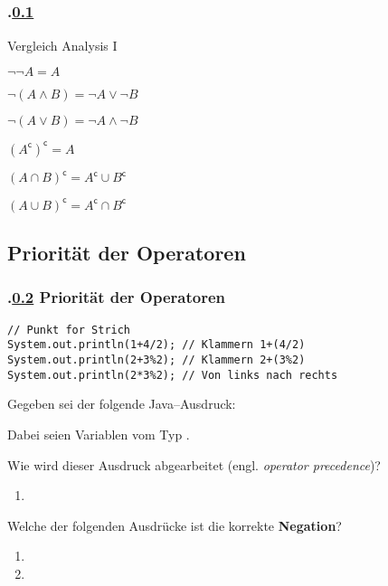 \subsection{\stitle}\label{S:Morgansche}
\begin{frame}[fragile]%
  \frametitle{\kap.\ref{S:Morgansche} \stitle}%
Vergleich Analysis I
\medskip

\begin{description}
  \item[und bzw. oder]
  \item $\neg \neg A = A$
  \item $\neg (A \wedge B) = \neg A \vee \neg B$
  \item $\neg (A \vee B) = \neg A \wedge \neg B$
\end{description}
\medskip

\begin{description}
  \item[Schnittmenge bzw. Vereinigung]
  \item $(A^{\mathsf{c}})^{\mathsf{c}} = A$
  \item $(A \cap B)^{\mathsf{c}} = A^{\mathsf{c}} \cup B^{\mathsf{c}}$
  \item $(A \cup B)^{\mathsf{c}} = A^{\mathsf{c}} \cap B^{\mathsf{c}}$
\end{description}
\end{frame}

\def\sstitle{Priorität der Operatoren}
\subsection{\sstitle}\label{S:Prioritat}
\begin{frame}[fragile]
  \frametitle{\kap.\ref{S:Prioritat} \sstitle}%

\begin{lstlisting}[style=java, frame=single]
// Punkt for Strich
System.out.println(1+4/2); // Klammern 1+(4/2)
System.out.println(2+3%2); // Klammern 2+(3%2)
System.out.println(2*3%2); // Von links nach rechts
\end{lstlisting}
\hfill

Gegeben sei der folgende Java--Ausdruck:
\begin{center}
\end{center}
Dabei seien  Variablen vom Typ .
\medskip

Wie wird dieser Ausdruck abgearbeitet (engl. \emph{operator precedence})?
\pause
\begin{enumerate}
  \item {}
\end{enumerate}
\pause
Welche der folgenden Ausdrücke ist die korrekte \textbf{Negation}?
\begin{enumerate}
  \item {}
  \item {}
\end{enumerate}

\end{frame}

